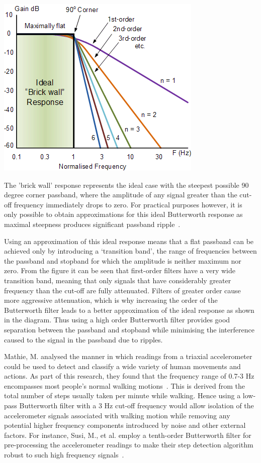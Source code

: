 \documentclass[12pt,a4paper,notitlepage]{report}
\begin{document}
\begin{center}
\includegraphics[scale=0.9]{images/butterworthResponse.png}
\label{fig:butterworthResponse}
\end{center}
The 'brick wall' response represents the ideal case with the steepest possible 90 degree corner passband, where the amplitude of any signal greater than the cut-off frequency immediately drops to zero. For practical purposes however, it is only possible to obtain approximations for this ideal Butterworth response as maximal steepness produces significant passband ripple~\cite{butterworthResponse}. 

Using an approximation of this ideal response means that a flat passband can be achieved only by introducing a `transition band', the range of frequencies between the passband and stopband for which the amplitude is neither maximum nor zero. From the figure it can be seen that first-order filters have a very wide transition band, meaning that only signals that have considerably greater frequency than the cut-off are fully attenuated. Filters of greater order cause more aggressive attenuation, which is why increasing the order of the Butterworth filter leads to a better approximation of the ideal response as shown in the diagram. Thus using a high order Butterworth filter provides good separation between the passband and stopband while minimising the interference caused to the signal in the passband due to ripples.    

Mathie, M. analysed the manner in which readings from a triaxial accelerometer could be used to detect and classify a wide variety of human movements and actions. As part of this research, they found that the frequency range of 0.7-3 Hz encompasses most people's normal walking motions~\cite[p.248]{walkingFrequency}. This is derived from the total number of steps usually taken per minute while walking. Hence using a low-pass Butterworth filter with a 3 Hz cut-off frequency would allow isolation of the accelerometer signals associated with walking motion while removing any potential higher frequency components introduced by noise and other external factors. For instance, Susi, M., et al. employ a tenth-order Butterworth filter for pre-processing the accelerometer readings to make their step detection algorithm robust to such high frequency signals~\cite[p.1552]{susi2013motion}.  
\end{document}
